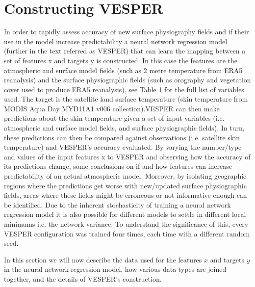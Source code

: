\documentclass[hess, twostagejnl]{copernicus}
\begin{document}
\section{Constructing VESPER}\label{sec:2}
In order to rapidly assess accuracy of new surface physiography fields and if their use in the model increase predictability a neural network regression model (further in the text referred as VESPER) that can learn the mapping between a set of features x and targets y is constructed. In this case the features are the atmospheric and surface model fields (such as 2 metre temperature from ERA5 reanalysis) and the surface physiographic fields (such as orography and vegetation cover used to produce ERA5 reanalysis), see Table 1 for the full list of variables used. The target is the satellite land surface temperature (skin temperature from MODIS Aqua Day MYD11A1 v006 collection).VESPER can then make predictions about the skin temperature given a set of input variables (i.e. atmospheric and surface model fields, and surface physiographic fields). In turn, these predictions can then be compared against observations (i.e. satellite skin temperature) and VESPER's accuracy evaluated. By varying the number/type and values of the input features x to VESPER and observing how the accuracy of its predictions change, some conclusions on if and how features can increase predictability of an actual atmospheric model. Moreover, by isolating geographic regions where the predictions get worse with new/updated surface physiographic fields, areas where these fields might be erroneous or not informative enough can be identified. Due to the inherent stochasticity of training a neural network regression model it is also possible for different models to settle in different local minimums i.e. the network variance. To understand the significance of this, every VESPER configuration was trained four times, each time with a different random seed. \newline 
	

\noindent In this section we will now describe the data used for the features $x$ and targets $y$ in the neural network regression model, how various data types are joined together, and the details of VESPER’s construction.
\end{document}
